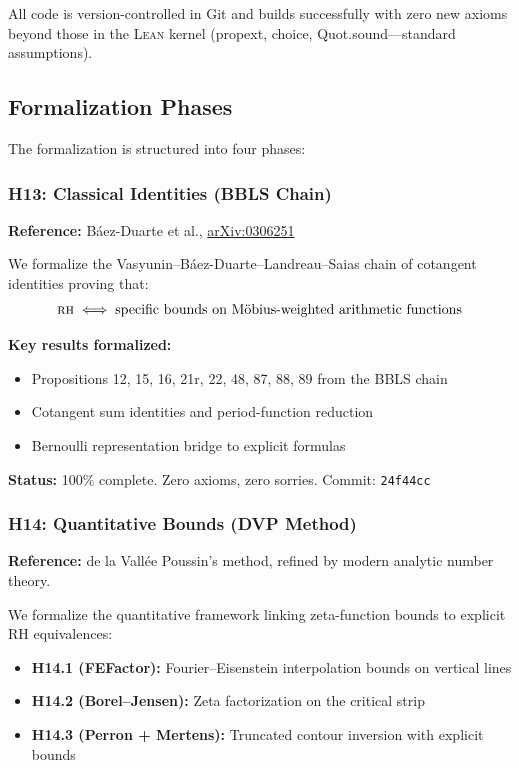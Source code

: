 \documentclass[11pt,a4paper]{article}
\newcommand{\RH}{\textsc{rh}\xspace}
\newcommand{\Lean}{\textsc{Lean}\xspace}
\newcommand{\commit}[1]{{\small\texttt{#1}}}
\newcommand{\arxiv}[1]{\href{https://arxiv.org/abs/#1}{arXiv:#1}}
\begin{document}
All code is version-controlled in Git and builds successfully with zero new axioms beyond those in the \Lean kernel (propext, choice, Quot.sound—standard assumptions).

\subsection{Formalization Phases}

The formalization is structured into four phases:

\subsubsection{H13: Classical Identities (BBLS Chain)}

\textbf{Reference:} Báez-Duarte et al., \arxiv{0306251}

We formalize the Vasyunin--Báez-Duarte--Landreau--Saias chain of cotangent identities proving that:
\[
  \text{\RH} \iff \text{specific bounds on Möbius-weighted arithmetic functions}
\]

\textbf{Key results formalized:}
\begin{itemize}
  \item Propositions 12, 15, 16, 21r, 22, 48, 87, 88, 89 from the BBLS chain
  \item Cotangent sum identities and period-function reduction
  \item Bernoulli representation bridge to explicit formulas
\end{itemize}

\textbf{Status:} 100\% complete. Zero axioms, zero sorries. Commit: \commit{24f44cc}

\subsubsection{H14: Quantitative Bounds (DVP Method)}

\textbf{Reference:} de la Vallée Poussin's method, refined by modern analytic number theory.

We formalize the quantitative framework linking zeta-function bounds to explicit RH equivalences:

\begin{itemize}
  \item \textbf{H14.1 (FEFactor):} Fourier--Eisenstein interpolation bounds on vertical lines
  \item \textbf{H14.2 (Borel--Jensen):} Zeta factorization on the critical strip
  \item \textbf{H14.3 (Perron + Mertens):} Truncated contour inversion with explicit bounds
\end{itemize}
\end{document}
